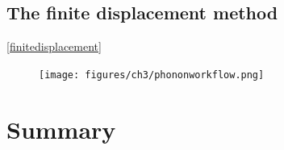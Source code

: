 \subsection{The finite displacement method} \ref{finitedisplacement}




\begin{figure}[h]
\centering
  \texttt{[image: figures/ch3/phononworkflow.png]}
  \caption[]{}
  \label{harmonicregime}
\end{figure}



\section{Summary}



